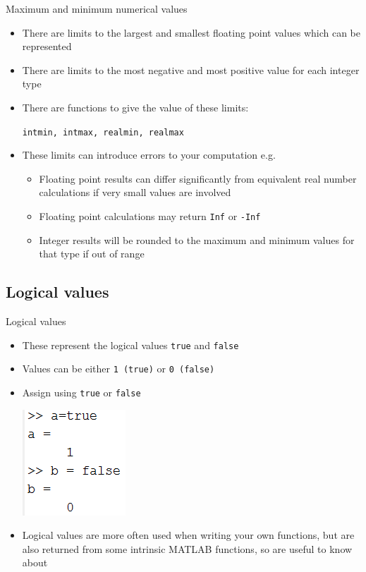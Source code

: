 \documentclass{beamer}
\begin{document}
\begin{frame}{Maximum and minimum numerical values}
	\begin{itemize}
		\item There are limits to the largest and smallest floating point values which can be represented
		\item There are limits to the most negative and most positive value for each integer type
		\item There are functions to give the value of these limits:
		
		\texttt{intmin, intmax, realmin, realmax}
		\item These limits can introduce errors to your computation e.g.
		
		\begin{itemize}
			\item Floating point results can differ significantly from equivalent real number calculations if very small values are involved
			\item Floating point calculations may return \texttt{Inf} or \texttt{-Inf}
			\item Integer results will be rounded to the maximum and minimum values for that type if out of range
		\end{itemize}
	\end{itemize}
\end{frame}

\subsection{Logical values}
\begin{frame}{Logical values}
	\begin{itemize}
		\item These represent the logical values \texttt{true} and \texttt{false}
		\item Values can be either \texttt{1 (true)} or \texttt{0 (false)}
		\item Assign using \texttt{true} or \texttt{false}
			
		\includegraphics[scale=0.7]{true_false_assignment}
		\item Logical values are more often used when writing your own functions, but are also returned from some intrinsic MATLAB functions, so are useful to know about
	\end{itemize}
\end{frame}
\end{document}
